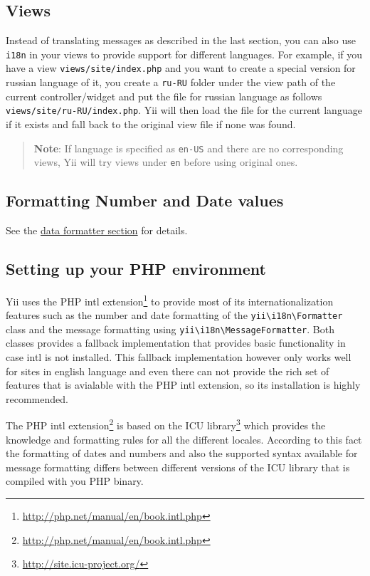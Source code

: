 \subsection{Views}
Instead of translating messages as described in the last section,
you can also use \lstinline|i18n| in your views to provide support for different languages. For example, if you have a view \lstinline|views/site/index.php| and
you want to create a special version for russian language of it, you create a \lstinline|ru-RU| folder under the view path of the current controller/widget and
put the file for russian language as follows \lstinline|views/site/ru-RU/index.php|. Yii will then load the file for the current language if it exists
and fall back to the original view file if none was found.

\begin{quote}\textbf{Note}: If language is specified as \lstinline|en-US| and there are no corresponding views, Yii will try views under \lstinline|en|
before using original ones.

\end{quote}
\subsection{Formatting Number and Date values}
See the \hyperref[output-formatter.md]{data formatter section} for details.

\subsection{Setting up your PHP environment \label{tutorial-i18n.md::setup-environment}}
Yii uses the PHP intl extension\footnote{\url{http://php.net/manual/en/book.intl.php}} to provide most of its internationalization features
such as the number and date formatting of the \texttt{yii{\allowbreak{}\textbackslash}i18n{\allowbreak{}\textbackslash}Formatter} class and the message formatting using \texttt{yii{\allowbreak{}\textbackslash}i18n{\allowbreak{}\textbackslash}MessageFormatter}.
Both classes provides a fallback implementation that provides basic functionality in case intl is not installed.
This fallback implementation however only works well for sites in english language and even there can not provide the
rich set of features that is avialable with the PHP intl extension, so its installation is highly recommended.

The PHP intl extension\footnote{\url{http://php.net/manual/en/book.intl.php}} is based on the ICU library\footnote{\url{http://site.icu-project.org/}} which
provides the knowledge and formatting rules for all the different locales. According to this fact the formatting of dates and numbers
and also the supported syntax available for message formatting differs between different versions of the ICU library that is compiled with
you PHP binary.

